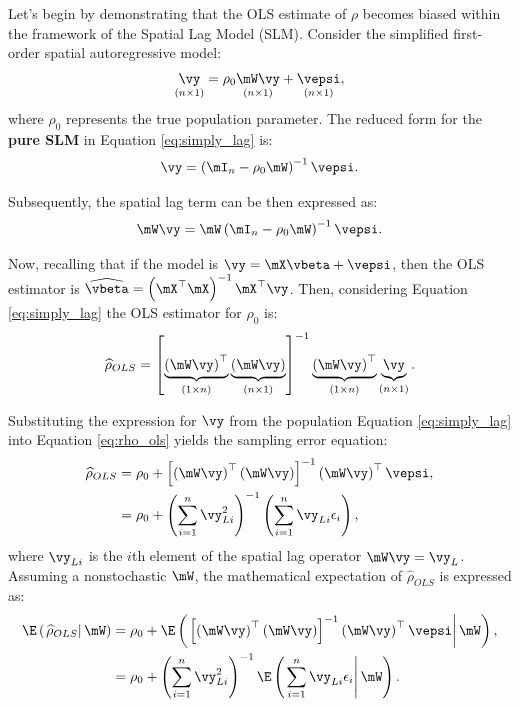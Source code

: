 \documentclass[english,12pt]{book}\usepackage[]{graphicx}\usepackage[]{xcolor}
\begin{document}
Let's begin by demonstrating that the OLS estimate of $\rho$ becomes biased within the framework of the Spatial Lag Model (SLM). Consider the simplified first-order spatial autoregressive model:
\begin{equation}\label{eq:simply_lag}
\underset{(n\times 1)}{\vy} = \rho_0\underset{(n\times 1)}{\mW\vy} + \underset{(n\times 1)}{\vepsi},
\end{equation}
%
where $\rho_0$ represents the true population parameter. The reduced form for the \textbf{pure SLM} in Equation  \eqref{eq:simply_lag} is:
\begin{equation}\label{eq:reduced_form_pure_slm}
\vy =\left(\mI_n - \rho_0\mW\right)^{-1}\vepsi.
\end{equation}

Subsequently, the spatial lag term can be then expressed as:
\begin{equation}\label{eq:wy_pure}
  \mW\vy = \mW\left(\mI_n - \rho_0\mW\right)^{-1}\vepsi.
\end{equation}

Now, recalling that if the model is $\vy = \mX\vbeta + \vepsi$, then the OLS estimator is $\widehat{\vbeta} = \left(\mX^\top\mX\right)^{-1}\mX^\top\vy$. Then, considering Equation \eqref{eq:simply_lag} the OLS estimator for $\rho_0$ is: 
\begin{equation}\label{eq:rho_ols}
\widehat{\rho}_{OLS} = \left[\underbrace{\left(\mW\vy \right)^\top}_{(1\times n)}\underbrace{\left(\mW\vy \right)}_{(n\times 1)}\right]^{-1}\underbrace{\left(\mW\vy \right)^\top}_{(1\times n)}\underbrace{\vy}_{(n\times 1)}.
\end{equation}

Substituting the expression for $\vy$ from the population Equation \eqref{eq:simply_lag} into Equation \eqref{eq:rho_ols} yields the sampling error equation:
\begin{equation*}
  \begin{aligned}
          \widehat{\rho}_{OLS} & = \rho_0 + \left[\left(\mW\vy \right)^\top\left(\mW\vy \right)\right]^{-1}\left(\mW\vy \right)^\top\vepsi, \\
                               & = \rho_0 + \left(\sum_{i = 1}^n \vy_{Li}^2\right)^{-1}\left(\sum_{i = 1}^{n}\vy_{Li}\epsilon_i\right),
  \end{aligned}
\end{equation*}
%
where $\vy_{Li}$ is the $i$th element of the spatial lag operator $\mW\vy = \vy_L$. Assuming a nonstochastic $\mW$, the mathematical expectation of $\widehat{\rho}_{OLS}$ is expressed as:
\begin{equation}\label{eq:expectation_of_pureslm}
  \begin{aligned}
\E\left(\left.\widehat{\rho}_{OLS}\right| \mW\right) & = \rho_0 + \E\left(\left.\left[\left(\mW\vy \right)^\top\left(\mW\vy \right)\right]^{-1}\left(\mW\vy \right)^\top\vepsi\right| \mW \right), \\
                         & = \rho_0 + \left(\sum_{i = 1}^n \vy_{Li}^2\right)^{-1}\E\left(\left.\sum_{i = 1}^{n}\vy_{Li}\epsilon_i\right| \mW\right).
  \end{aligned}
\end{equation}
\end{document}
